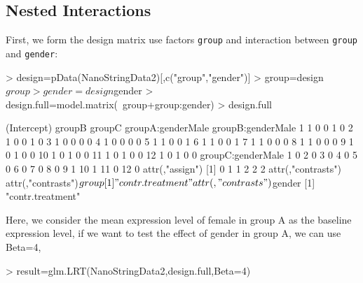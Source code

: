 \documentclass[12pt]{article}
\begin{document}
\subsection{Nested Interactions}
First, we form the design matrix use factors {\tt group} and interaction 
between {\tt group} and {\tt gender}:
\begin{Schunk}
\begin{Sinput}
> design=pData(NanoStringData2)[,c("group","gender")]
> group=design$group
> gender=design$gender
> design.full=model.matrix(~group+group:gender)
> design.full
\end{Sinput}
\begin{Soutput}
   (Intercept) groupB groupC groupA:genderMale groupB:genderMale
1            1      0      0                 1                 0
2            1      0      0                 1                 0
3            1      0      0                 0                 0
4            1      0      0                 0                 0
5            1      1      0                 0                 1
6            1      1      0                 0                 1
7            1      1      0                 0                 0
8            1      1      0                 0                 0
9            1      0      1                 0                 0
10           1      0      1                 0                 0
11           1      0      1                 0                 0
12           1      0      1                 0                 0
   groupC:genderMale
1                  0
2                  0
3                  0
4                  0
5                  0
6                  0
7                  0
8                  0
9                  1
10                 1
11                 0
12                 0
attr(,"assign")
[1] 0 1 1 2 2 2
attr(,"contrasts")
attr(,"contrasts")$group
[1] "contr.treatment"

attr(,"contrasts")$gender
[1] "contr.treatment"
\end{Soutput}
\end{Schunk}

Here, we consider the mean expression level of female in group A as the 
baseline expression level, if we want to test the effect of gender in 
group A, we can use Beta=4,
\begin{Schunk}
\begin{Sinput}
> result=glm.LRT(NanoStringData2,design.full,Beta=4)
\end{Sinput}
\end{Schunk}
\end{document}
